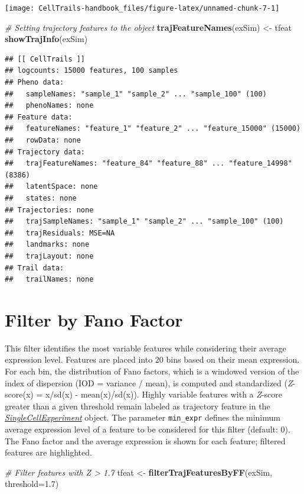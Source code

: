 \documentclass[]{book}
\newenvironment{Shaded}{\begin{snugshade}}{\end{snugshade}}
\newcommand{\KeywordTok}[1]{\textcolor[rgb]{0.13,0.29,0.53}{\textbf{#1}}}
\newcommand{\DataTypeTok}[1]{\textcolor[rgb]{0.13,0.29,0.53}{#1}}
\newcommand{\FloatTok}[1]{\textcolor[rgb]{0.00,0.00,0.81}{#1}}
\newcommand{\StringTok}[1]{\textcolor[rgb]{0.31,0.60,0.02}{#1}}
\newcommand{\CommentTok}[1]{\textcolor[rgb]{0.56,0.35,0.01}{\textit{#1}}}
\newcommand{\NormalTok}[1]{#1}
\theoremstyle{definition}
\theoremstyle{definition}
\theoremstyle{definition}
\theoremstyle{remark}
\begin{document}
\texttt{[image: CellTrails-handbook\_files/figure-latex/unnamed-chunk-7-1]}

\begin{Shaded}
\begin{Highlighting}[]
\CommentTok{# Setting trajectory features to the object}
\KeywordTok{trajFeatureNames}\NormalTok{(exSim) <-}\StringTok{ }\NormalTok{tfeat}
\KeywordTok{showTrajInfo}\NormalTok{(exSim)}
\end{Highlighting}
\end{Shaded}

\begin{verbatim}
## [[ CellTrails ]] 
## logcounts: 15000 features, 100 samples
## Pheno data: 
##   sampleNames: "sample_1" "sample_2" ... "sample_100" (100)
##   phenoNames: none
## Feature data: 
##   featureNames: "feature_1" "feature_2" ... "feature_15000" (15000)
##   rowData: none
## Trajectory data: 
##   trajFeatureNames: "feature_84" "feature_88" ... "feature_14998" (8386)
##   latentSpace: none
##   states: none
## Trajectories: none
##   trajSampleNames: "sample_1" "sample_2" ... "sample_100" (100)
##   trajResiduals: MSE=NA
##   landmarks: none
##   trajLayout: none
## Trail data: 
##   trailNames: none
\end{verbatim}

\section{Filter by Fano Factor}\label{filter-by-fano-factor}

This filter identifies the most variable features while considering
their average expression level. Features are placed into 20 bins based
on their mean expression. For each bin, the distribution of Fano
factors, which is a windowed version of the index of dispersion (IOD =
variance / mean), is computed and standardized (\emph{Z}-score(x) =
x/sd(x) - mean(x)/sd(x)). Highly variable features with a \emph{Z}-score
greater than a given threshold remain labeled as trajectory feature in
the
\emph{\href{http://bioconductor.org/packages/SingleCellExperiment}{SingleCellExperiment}}
object. The parameter \texttt{min\_expr} defines the minimum average
expression level of a feature to be considered for this filter (default:
0). The Fano factor and the average expression is shown for each
feature; filtered features are highlighted.

\begin{Shaded}
\begin{Highlighting}[]
\CommentTok{# Filter features with Z > 1.7}
\NormalTok{tfeat <-}\StringTok{ }\KeywordTok{filterTrajFeaturesByFF}\NormalTok{(exSim, }\DataTypeTok{threshold=}\FloatTok{1.7}\NormalTok{)}
\end{Highlighting}
\end{Shaded}
\end{document}
